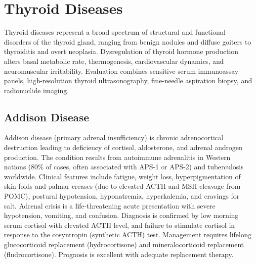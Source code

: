 \section{Thyroid Diseases}




Thyroid diseases represent a broad spectrum of structural and functional disorders of the thyroid gland, ranging from benign nodules and diffuse goiters to thyroiditis and overt neoplasia. Dysregulation of thyroid hormone production alters basal metabolic rate, thermogenesis, cardiovascular dynamics, and neuromuscular irritability. Evaluation combines sensitive serum immunoassay panels, high-resolution thyroid ultrasonography, fine-needle aspiration biopsy, and radionuclide imaging.





\label{sec:Thyroid Diseases}

\subsection{Addison Disease}
\label{sec:Addison Disease}
Addison disease (primary adrenal insufficiency) is chronic adrenocortical destruction leading to deficiency of cortisol, aldosterone, and adrenal androgen production. The condition results from autoimmune adrenalitis in Western nations (80\% of cases, often associated with APS-1 or APS-2) and tuberculosis worldwide. Clinical features include fatigue, weight loss, hyperpigmentation of skin folds and palmar creases (due to elevated ACTH and MSH cleavage from POMC), postural hypotension, hyponatremia, hyperkalemia, and cravings for salt. Adrenal crisis is a life-threatening acute presentation with severe hypotension, vomiting, and confusion. Diagnosis is confirmed by low morning serum cortisol with elevated ACTH level, and failure to stimulate cortisol in response to the cosyntropin (synthetic ACTH) test. Management requires lifelong glucocorticoid replacement (hydrocortisone) and mineralocorticoid replacement (fludrocortisone). Prognosis is excellent with adequate replacement therapy.

